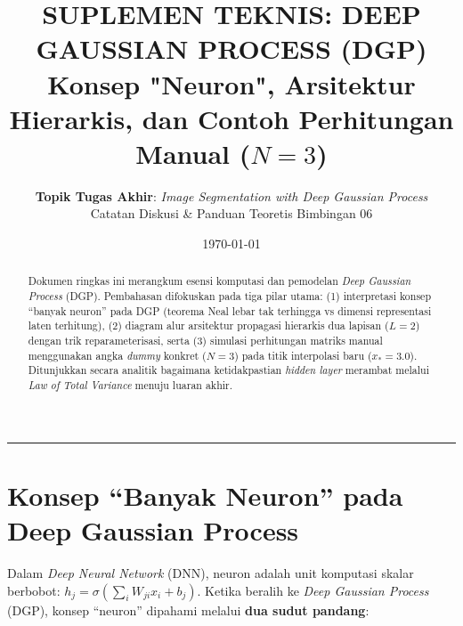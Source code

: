 \documentclass[11pt,a4paper]{article}
\title{
    \vspace{-1.2cm}
    \textbf{\Large SUPLEMEN TEKNIS: DEEP GAUSSIAN PROCESS (DGP)} \\[0.3em]
    \textbf{\large Konsep "Neuron", Arsitektur Hierarkis, dan Contoh Perhitungan Manual ($N = 3$)}
}
\author{
    \textbf{Topik Tugas Akhir}: \textit{Image Segmentation with Deep Gaussian Process} \\
    Catatan Diskusi \& Panduan Teoretis Bimbingan 06
}
\date{\today}
\begin{document}
\maketitle
\vspace{-0.5cm}

\begin{abstract}
\noindent Dokumen ringkas ini merangkum esensi komputasi dan pemodelan \textit{Deep Gaussian Process} (DGP). Pembahasan difokuskan pada tiga pilar utama: (1) interpretasi konsep ``banyak neuron'' pada DGP (teorema Neal lebar tak terhingga vs dimensi representasi laten terhitung), (2) diagram alur arsitektur propagasi hierarkis dua lapisan ($L = 2$) dengan trik reparameterisasi, serta (3) simulasi perhitungan matriks manual menggunakan angka \textit{dummy} konkret ($N = 3$) pada titik interpolasi baru ($x_* = 3.0$). Ditunjukkan secara analitik bagaimana ketidakpastian \textit{hidden layer} merambat melalui \textit{Law of Total Variance} menuju luaran akhir.
\end{abstract}

\vspace{0.1cm}
\hrule
\vspace{0.2cm}

\section{Konsep ``Banyak Neuron'' pada Deep Gaussian Process}
\label{sec:konsep_neuron}

\noindent Dalam \textit{Deep Neural Network} (DNN), neuron adalah unit komputasi skalar berbobot: $h_j = \sigma(\sum_i W_{ji} x_i + b_j)$. Ketika beralih ke \textit{Deep Gaussian Process} (DGP), konsep ``neuron'' dipahami melalui \textbf{dua sudut pandang}:
\end{document}
